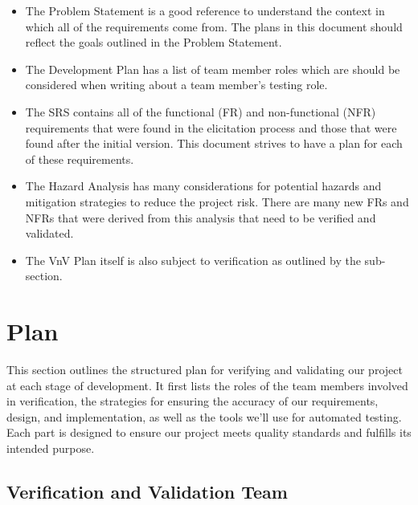 \documentclass[12pt, titlepage]{article}
\begin{document}
\begin{itemize}
  \item The Problem Statement is a good reference to understand the context in which all of the requirements come from. The plans in this document should reflect the goals outlined in the Problem Statement.
  \item The Development Plan has a list of team member roles which are should be considered when writing about a team member's testing role.
  \item The SRS contains all of the functional (FR) and non-functional (NFR) requirements that were found in the elicitation process and those that were found after the initial version. This document strives to have a plan for each of these requirements.
  \item The Hazard Analysis has many considerations for potential hazards and mitigation strategies to reduce the project risk. There are many new FRs and NFRs that were derived from this analysis that need to be verified and validated.
  \item The VnV Plan itself is also subject to verification as outlined by the  sub-section.
\end{itemize}

\newrefsection

\section{Plan}
\label{sub:plan}

This section outlines the structured plan for verifying and validating our project at each stage of development. It first lists the roles of the team members involved in verification, the strategies for ensuring the accuracy of our requirements, design, and implementation, as well as the tools we'll use for automated testing. Each part is designed to ensure our project meets quality standards and fulfills its intended purpose.

\newpage
\subsection{Verification and Validation Team}
\end{document}
